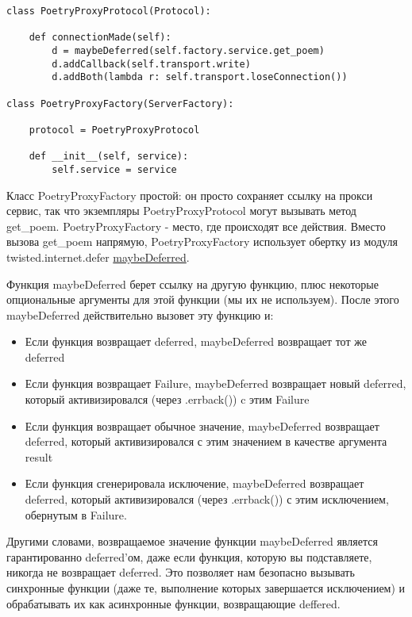  \begin{verbatim}
class PoetryProxyProtocol(Protocol):

    def connectionMade(self):
        d = maybeDeferred(self.factory.service.get_poem)
        d.addCallback(self.transport.write)
        d.addBoth(lambda r: self.transport.loseConnection())

class PoetryProxyFactory(ServerFactory):

    protocol = PoetryProxyProtocol

    def __init__(self, service):
        self.service = service
\end{verbatim} 


Класс PoetryProxyFactory простой: он просто сохраняет 
ссылку на прокси сервис, так что экземпляры PoetryProxyProtocol 
могут вызывать метод get\_poem. PoetryProxyFactory - место, где 
происходят все действия. Вместо вызова get\_poem напрямую, 
PoetryProxyFactory использует обертку из модуля twisted.internet.defer 
\href{http://twistedmatrix.com/trac/browser/tags/releases/twisted-8.2.0/twisted/internet/defer.py#L84}{maybeDeferred}.


Функция maybeDeferred берет ссылку на другую функцию, 
плюс некоторые опциональные аргументы для этой 
функции (мы их не используем). После этого maybeDeferred 
действительно вызовет эту функцию и:

\begin{itemize}

\item Если функция возвращает deferred, maybeDeferred 
возвращает тот же deferred

\item Если функция возвращает Failure, maybeDeferred 
возвращает новый deferred, который активизировался (через 
.errback()) c этим Failure

\item Если функция возвращает обычное значение, maybeDeferred 
возвращает deferred, который активизировался с этим значением в 
качестве аргумента result

\item Если функция сгенерировала исключение, maybeDeferred 
возвращает deferred, который активизировался (через .errback()) с 
этим исключением, обернутым в Failure.

\end{itemize}


Другими словами, возвращаемое значение функции maybeDeferred 
является гарантированно deferred'ом, даже если функция, которую 
вы подставляете, никогда не возвращает deferred. Это позволяет 
нам безопасно вызывать синхронные функции (даже те, выполнение 
которых завершается исключением) и обрабатывать их как 
асинхронные функции, возвращающие deffered.


